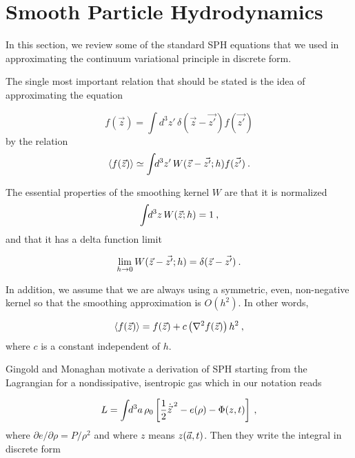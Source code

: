 \section{Smooth Particle Hydrodynamics}\label{sph}

In this section, we review some of the standard SPH equations
\cite{A:NP94,A:JJM92,A:WB89,A:GM82,A:PJM91} that we used in approximating the
continuum variational principle in discrete form.

The single most important relation that should be stated is the idea of
approximating the equation

\begin{equation}
    f({\vec z}) = \int\!\! d^3z'\,\delta({\vec z} - \vec{ z'}) f(\vec{z'})
\end{equation}
%
by the relation
\begin{equation}\label{sph_fun}
    \langle f({\vec z}) \rangle \simeq \int\!\! d^3z'\,W({\vec z}
    - \vec{z'}; h) f(\vec{z'}) \: .
\end{equation}

The essential properties of the smoothing kernel $W$ are that it is normalized
\begin{equation}\label{norm}
    \int\!\! d^3z\,W({\vec z};h) = 1 \: ,
\end{equation}
%
and that it has a delta function limit

\begin{equation}
    \lim_{h \rightarrow 0} W({\vec z} - \vec{z'};h) = \delta({\vec z}
    - \vec{z'}) \: .
\end{equation}

In addition, we assume that we are always using a symmetric, even,
non-negative kernel so that the smoothing approximation is $O(h^2)$.
In other words,

\begin{equation}
    \langle f({\vec z}) \rangle = f({\vec z}) + c \left( \nabla^2 f({\vec z}) \right) h^2 \: ,
\end{equation}
%
where $c$ is a constant independent of $h$.

Gingold and Monaghan \cite{A:GM82} motivate a derivation of SPH starting from
the Lagrangian for a nondissipative, isentropic gas which in our notation reads

\begin{equation}
    L = \int\!\! d^3a\,\rho_0 \left[ \frac{1}{2} {\dot {\vec z}\,}^2 -
        e(\rho) - \Phi(z,t)\right] \: ,
\end{equation}
%
where ${\partial e}/{\partial \rho} = {P}/{\rho^2}$ and where $z$ means
$z({\vec a},t)$.  Then they write the integral in discrete form

